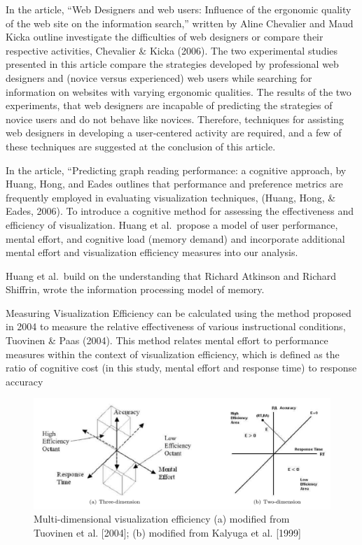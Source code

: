 \documentclass[print]{nuthesis}
\begin{document}
In the article, ``Web Designers and web users: Influence of the ergonomic quality of the web site on the information search,'' written by Aline Chevalier and Maud Kicka outline investigate the difficulties of web designers or compare their respective activities, Chevalier \& Kicka (2006).
The two experimental studies presented in this article compare the strategies developed by professional web designers and (novice versus experienced) web users while searching for information on websites with varying ergonomic qualities.
The results of the two experiments, that web designers are incapable of predicting the strategies of novice users and do not behave like novices.
Therefore, techniques for assisting web designers in developing a user-centered activity are required, and a few of these techniques are suggested at the conclusion of this article.

In the article, ``Predicting graph reading performance: a cognitive approach, by Huang, Hong, and Eades outlines that performance and preference metrics are frequently employed in evaluating visualization techniques, (Huang, Hong, \& Eades, 2006).
To introduce a cognitive method for assessing the effectiveness and efficiency of visualization.
Huang et al.~propose a model of user performance, mental effort, and cognitive load (memory demand) and incorporate additional mental effort and visualization efficiency measures into our analysis.

Huang et al.~build on the understanding that Richard Atkinson and Richard Shiffrin, wrote the information processing model of memory.

Measuring Visualization Efficiency can be calculated using the method proposed in 2004 to measure the relative effectiveness of various instructional conditions, Tuovinen \& Paas (2004).
This method relates mental effort to performance measures within the context of visualization efficiency, which is defined as the ratio of cognitive cost (in this study, mental effort and response time) to response accuracy

\begin{figure}

{\centering \includegraphics[width=0.45\linewidth]{figure/multi_dim_viz} 

}

\caption{Multi-dimensional visualization efficiency (a) modified from Tuovinen et al. [2004]; (b) modified from Kalyuga et al. [1999]}\label{fig:viseff}
\end{figure}
\end{document}
